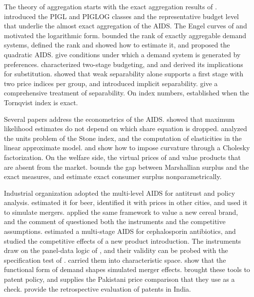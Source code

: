 The theory of aggregation starts with the exact aggregation results of \citet{Gorman1953,Gorman1961}.
\citet{Muellbauer1975,Muellbauer1976} introduced the PIGL and PIGLOG classes and the representative budget level
that underlie the almost exact aggregation of the AIDS. The Engel curves of \citet{Working1943} and \citet{Leser1963}
motivated the logarithmic form. \citet{Gorman1981} bounded the rank of exactly aggregable demand systems,
\citet{Lewbel1991} defined the rank and showed how to estimate it, and \citet{BanksBlundellLewbel1997} proposed the
quadratic AIDS. \citet{HurwiczUzawa1971} give conditions under which a demand system is generated by preferences.
\citet{Gorman1959} characterized two-stage budgeting, and \citet{GoldmanUzawa1964} and \citet{Gorman1971} derived
its implications for substitution. \citet{BartenTurnovsky1966} showed that weak separability alone supports a first
stage with two price indices per group, and \citet{Gorman1970} introduced implicit separability.
\citet{BlackorbyPrimontRussell1978} give a comprehensive treatment of separability. On index numbers,
\citet{Diewert1976} established when the Tornqvist index is exact.

Several papers address the econometrics of the AIDS. \citet{Barten1969} showed that maximum likelihood estimates do
not depend on which share equation is dropped. \citet{Moschini1995} analyzed the units problem of the Stone index,
and \citet{GreenAlston1990} the computation of elasticities in the linear approximate model. \citet{Lau1978} and
\citet{Moschini1999} show how to impose curvature through a Cholesky factorization. On the welfare side, the virtual
prices of \citet{Hicks1940} and \citet{Rothbarth1941} value products that are absent from the market.
\citet{Willig1976} bounds the gap between Marshallian surplus and the exact measures, and \citet{HausmanNewey1995}
estimate exact consumer surplus nonparametrically.

Industrial organization adopted the multi-level AIDS for antitrust and policy analysis.
\citet{HausmanLeonardZona1994} estimated it for beer, identified it with prices in other cities, and used it to
simulate mergers. \citet{Hausman1997} applied the same framework to value a new cereal brand, and the comment of
\citet{Bresnahan1997} questioned both the instruments and the competitive assumptions. \citet{EllisonEtAl1997}
estimated a multi-stage AIDS for cephalosporin antibiotics, and \citet{HausmanLeonard2002} studied the competitive
effects of a new product introduction. The instruments draw on the panel-data logic of \citet{HausmanTaylor1981},
and their validity can be probed with the specification test of \citet{Hausman1978}. \citet{Nevo2001} carried them
into characteristic space. \citet{CrookeEtAl1999} show that the functional form of demand shapes simulated merger
effects. \citet{ChaudhuriGoldbergJia2006} brought these tools to patent policy, and \citet{Lanjouw1998} supplies the
Pakistani price comparison that they use as a check. \citet{DugganGarthwaiteGoyal2016} provide the retrospective
evaluation of patents in India.

